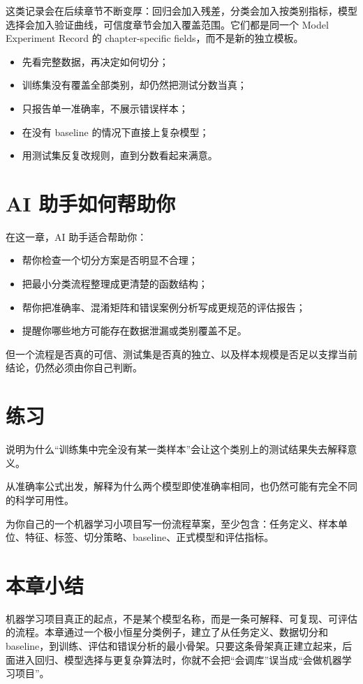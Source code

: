 这类记录会在后续章节不断变厚：回归会加入残差，分类会加入按类别指标，模型选择会加入验证曲线，可信度章节会加入覆盖范围。它们都是同一个 Model Experiment Record 的 chapter-specific fields，而不是新的独立模板。

\begin{warnbox}[机器学习流程中的典型问题]
\begin{itemize}
    \item 先看完整数据，再决定如何切分；
    \item 训练集没有覆盖全部类别，却仍然把测试分数当真；
    \item 只报告单一准确率，不展示错误样本；
    \item 在没有 baseline 的情况下直接上复杂模型；
    \item 用测试集反复改规则，直到分数看起来满意。
\end{itemize}
\end{warnbox}

\section{AI 助手如何帮助你}

在这一章，AI 助手适合帮助你：

\begin{itemize}
    \item 帮你检查一个切分方案是否明显不合理；
    \item 把最小分类流程整理成更清楚的函数结构；
    \item 帮你把准确率、混淆矩阵和错误案例分析写成更规范的评估报告；
    \item 提醒你哪些地方可能存在数据泄漏或类别覆盖不足。
\end{itemize}

但一个流程是否真的可信、测试集是否真的独立、以及样本规模是否足以支撑当前结论，仍然必须由你自己判断。

\section{练习}

\begin{exercisebox}[基础练习]
说明为什么“训练集中完全没有某一类样本”会让这个类别上的测试结果失去解释意义。
\end{exercisebox}

\begin{exercisebox}[进阶练习]
从准确率公式出发，解释为什么两个模型即使准确率相同，也仍然可能有完全不同的科学可用性。
\end{exercisebox}

\begin{exercisebox}[开放练习]
为你自己的一个机器学习小项目写一份流程草案，至少包含：任务定义、样本单位、特征、标签、切分策略、baseline、正式模型和评估指标。
\end{exercisebox}

\section{本章小结}

机器学习项目真正的起点，不是某个模型名称，而是一条可解释、可复现、可评估的流程。本章通过一个极小恒星分类例子，建立了从任务定义、数据切分和 baseline，到训练、评估和错误分析的最小骨架。只要这条骨架真正建立起来，后面进入回归、模型选择与更复杂算法时，你就不会把“会调库”误当成“会做机器学习项目”。
